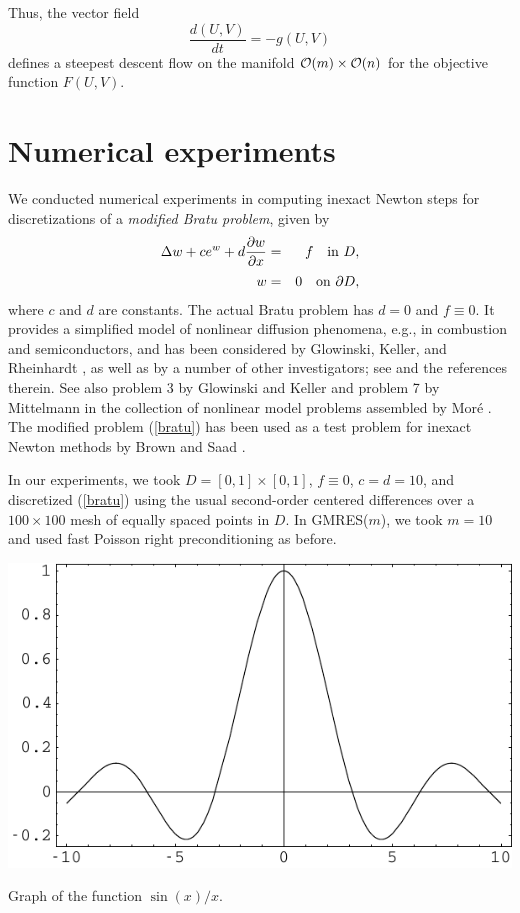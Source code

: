 \documentclass[myposter,portrait]{sciposter}
\def\mysection#1{
{\color{sectionCol}\section*{\sc\bfseries #1}}}
\begin{document}
\begin{multicols*}{3}
Thus, the vector field
\begin{equation}
\frac{d(U,V)}{dt} = -g(U,V) 	\label{eq2.15}
\end{equation}
defines a steepest descent flow on the manifold  ${\cal O} (m) \times
{\cal O} (n)$ for the objective function  $F(U,V)$.

\columnbreak 

\mysection{Numerical experiments} 

We conducted numerical experiments 
in computing inexact Newton steps for discretizations of a  
{\em modified Bratu problem}, given by  
\begin{eqnarray} 
{\displaystyle \Delta w + c e^w + d{ {\partial w}\over{\partial x} } } 
&=&{\displaystyle f \quad {\rm in}\ D, }\nonumber\\[-1.5ex]
\label{bratu} \\[-1.5ex]
{\displaystyle w }&=&{\displaystyle 0 \quad {\rm on}\ \partial D , } \nonumber
\end{eqnarray} 
where $c$ and $d$ are constants. The actual Bratu problem has $d=0$ and  
$f \equiv0$. It provides a simplified model of nonlinear diffusion  
phenomena, e.g., in combustion and semiconductors, and has been 
considered by Glowinski, Keller, and Rheinhardt \cite{GloKR85}, 
as well as by a number of other investigators; see \cite{GloKR85} 
and the references therein. See also problem 3 by Glowinski and  Keller  
and problem 7 by Mittelmann in the collection of nonlinear model 
problems assembled by Mor\'e \cite{More}. The modified problem  
(\ref{bratu}) has been used as a test problem for inexact Newton 
methods by Brown and Saad \cite{Brown-Saad1}.  

\def\gmres{{GMRES}} 
\def\gmresm{{\rm GMRES($m$)}} 

In our experiments, we took $D = [0,1]\times[0,1]$, $f \equiv0$, 
$c=d=10$, and discretized (\ref{bratu}) using the usual second-order 
centered differences over a $100\times100$ mesh of equally 
spaced points in $D$. In \gmres($m$), we took $m=10$ and used fast  
Poisson right preconditioning as before.

\bigskip 
\includegraphics[width=\columnwidth]{images/fig}
\caption{Graph of the function $\sin(x)/x$.} 
 




\end{multicols*}
\end{document}
